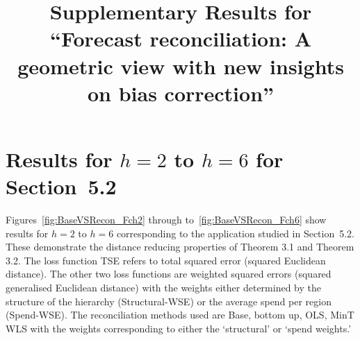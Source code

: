 \documentclass[12pt]{article}
\title{\bf Supplementary Results for ``Forecast reconciliation: A geometric view with new insights on bias correction''}
\begin{document}
  \maketitle
  \section{Results for $h=2$ to $h=6$ for Section~5.2}
  	
  	
  	Figures~\ref{fig:BaseVSRecon_Fch2} through to~\ref{fig:BaseVSRecon_Fch6} show results for $h=2$ to $h=6$ corresponding to the application studied in Section~5.2.  These demonstrate the distance reducing properties of Theorem 3.1 and Theorem 3.2. The loss function TSE refers to total squared error (squared Euclidean distance).  The other two loss functions are weighted squared errors (squared generalised Euclidean distance) with the weights either determined by the structure of the hierarchy (Structural-WSE) or the average spend per region (Spend-WSE).  The reconciliation methods used are Base, bottom up, OLS, MinT WLS with the weights corresponding to either the `structural' or `spend weights.'
  	
\end{document}
